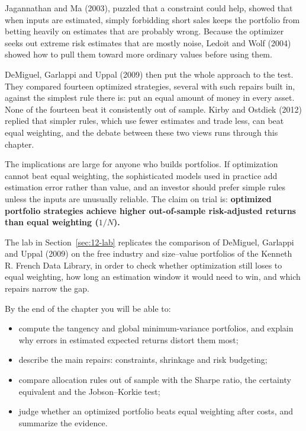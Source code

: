Jagannathan and Ma (2003), puzzled that a constraint could help, showed that when inputs are estimated, simply forbidding short sales keeps the portfolio from betting heavily on estimates that are probably wrong. Because the optimizer seeks out extreme risk estimates that are mostly noise, Ledoit and Wolf (2004) showed how to pull them toward more ordinary values before using them. 

DeMiguel, Garlappi and Uppal (2009) then put the whole approach to the test. They compared fourteen optimized strategies, several with such repairs built in, against the simplest rule there is: put an equal amount of money in every asset. None of the fourteen beat it consistently out of sample. Kirby and Ostdiek (2012) replied that simpler rules, which use fewer estimates and trade less, can beat equal weighting, and the debate between these two views runs through this chapter.

The implications are large for anyone who builds portfolios. If optimization cannot beat equal weighting, the sophisticated models used in practice add estimation error rather than value, and an investor should prefer simple rules unless the inputs are unusually reliable. The claim on trial is: \textbf{optimized portfolio strategies achieve higher out-of-sample risk-adjusted returns than equal weighting ($1/N$).}

The lab in Section~\ref{sec:12-lab} replicates the comparison of DeMiguel, Garlappi and Uppal (2009) on the free industry and size--value portfolios of the Kenneth R. French Data Library, in order to check whether optimization still loses to equal weighting, how long an estimation window it would need to win, and which repairs narrow the gap.

By the end of the chapter you will be able to:

\begin{itemize}
  \item compute the tangency and global minimum-variance portfolios, and explain why errors in estimated expected returns distort them most;
  \item describe the main repairs: constraints, shrinkage and risk budgeting;
  \item compare allocation rules out of sample with the Sharpe ratio, the certainty equivalent and the Jobson--Korkie test;
  \item judge whether an optimized portfolio beats equal weighting after costs, and summarize the evidence.
\end{itemize}


